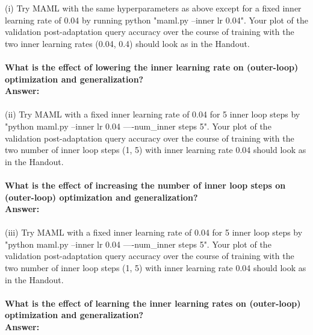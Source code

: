 \begin{answer}


    \large
    (i) Try MAML with the same hyperparameters as above except for a fixed inner learning rate of 0.04 by running python "maml.py --inner lr 0.04". Your plot of the validation post-adaptation query accuracy over the course of training with the two inner learning rates (0.04, 0.4) should look as in the Handout.
    \\
    \\
    \textbf{What is the effect of lowering the inner learning rate on (outer-loop) optimization and generalization?}
    \normalsize
    \\

    \textbf{Answer: }
    \\
    \\
    
    \large
    (ii) Try MAML with a fixed inner learning rate of 0.04 for 5 inner loop steps by "python maml.py --inner lr 0.04 ----num\_inner steps 5". Your plot of the validation post-adaptation query accuracy over the course of training with the two number of inner loop steps (1, 5) with inner learning rate 0.04 should look as in the Handout.
    \\
    \\
    \textbf{What is the effect of increasing the number of inner loop steps on (outer-loop) optimization and generalization?}
    \normalsize
    \\

    \textbf{Answer:}
    \\
    \\

    \large
    (iii) Try MAML with a fixed inner learning rate of 0.04 for 5 inner loop steps by "python maml.py --inner lr 0.04 ----num\_inner steps 5". Your plot of the validation post-adaptation query accuracy over the course of training with the two number of inner loop steps (1, 5) with inner learning rate 0.04 should look as in the Handout.
    \\
    \\
    \textbf{What is the effect of learning the inner learning rates on (outer-loop) optimization and generalization?}
    \normalsize
    \\

    \textbf{Answer:}
    \\
    \\

    

\end{answer}



\clearpage



